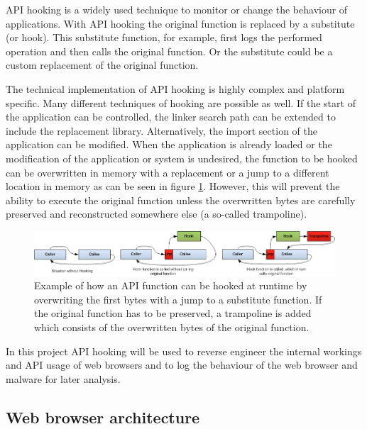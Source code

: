 API hooking is a widely used technique to monitor or change the behaviour of applications. With API hooking the original function is replaced by a substitute (or hook). This substitute function, for example, first logs the performed operation and then calls the original function. Or the substitute could be a custom replacement of the original function.

The technical implementation of API hooking is highly complex and platform specific. Many different techniques \cite{jbremer2012} of hooking are possible as well. If the start of the application can be controlled, the linker search path can be extended to include the replacement library. Alternatively, the import section of the application can be modified. When the application is already loaded or the modification of the application or system is undesired, the function to be hooked can be overwritten in memory with a replacement or a jump to a different location in memory as can be seen in figure \ref{fig:apihooking}. However, this will prevent the ability to execute the original function unless the overwritten bytes are carefully preserved and reconstructed somewhere else (a so-called trampoline).

\begin{figure}
    \centering
    \includegraphics[width=14.7cm]{Images/API-hooking.png}
    \caption{Example of how an API function can be hooked at runtime by overwriting the first bytes with a jump to a substitute function. If the original function has to be preserved, a trampoline is added which consists of the overwritten bytes of the original function. \cite{APIHookImage}}
    \label{fig:apihooking}
\end{figure}

In this project API hooking will be used to reverse engineer the internal workings and API usage of web browsers and to log the behaviour of the web browser and malware for later analysis.




\subsection{Web browser architecture}

